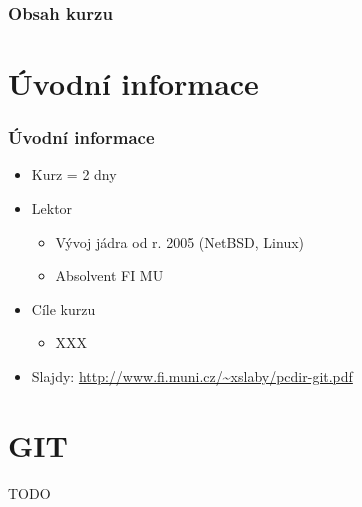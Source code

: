 


\date{1--3. 6. \the\year}



\frame{\titlepage}


\begin{frame}
  \frametitle{Obsah kurzu}
  \tableofcontents
\end{frame}

\section{Úvodní informace}
\frame{\sectionpage}

\begin{frame}
  \frametitle{Úvodní informace}
  \begin{itemize}
    \item Kurz = 2 dny

    \pause

    \item Lektor
    \begin{itemize}
      \item Vývoj jádra od r. 2005 (NetBSD, Linux)
      \item Absolvent FI MU
    \end{itemize}

    \pause

    \item Cíle kurzu
    \begin{itemize}
      \item XXX
    \end{itemize}

    \pause

    \item Slajdy: \url{http://www.fi.muni.cz/~xslaby/pcdir-git.pdf}

  \end{itemize}

\end{frame}

\section{GIT}
TODO


